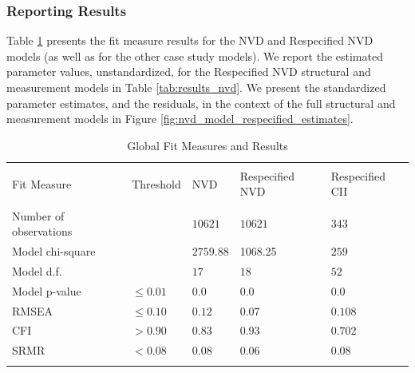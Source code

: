 \subsubsection{Reporting Results}
\label{sec:case_nvd_results}

Table \ref{tab:results_fit_all} presents the fit measure results for the NVD  and Respecified NVD models (as well as for the other case study models). We report the estimated parameter values, unstandardized, for the Respecified NVD structural and measurement models in Table \ref{tab:results_nvd}. We present the standardized parameter estimates, and the residuals, in the context of the full structural and measurement models in Figure \ref{fig:nvd_model_respecified_estimates}.

\begin{table}
	\begin{center}	
		\caption{Global Fit Measures and Results}
			\label{tab:results_fit_all}
			\begin{tabular}{p{3cm}p{1cm}|p{2cm}p{2cm}p{2cm}}
				\\[-1.8ex]\hline 
				\hline \\[-1.8ex] 
				Fit Measure & Threshold & NVD	& Respecified NVD & Respecified CII  \\
				\hline \\[-1.8ex] 				
				Number of observations &  & $10621$  & $10621$ & $343$  \\				
				Model chi-square &  & $2759.88$ & 1068.25 & $259$  \\				
				Model d.f. &  & $17$ & $18$ & $52$  \\		
				Model p-value & $\leq 0.01$ & $0.0$ & $0.0$ & $0.0$  \\
				RMSEA & $\leq 0.10$ &  $0.12$ &  $0.07$ & $0.108$   \\
				CFI & $> 0.90$ & $0.83$ & $0.93$  & $0.702$  \\
				SRMR & $< 0.08$ & $0.08$ & $0.06$ & $0.08$  \\
				\hline \\[-1.8ex] 				
			\end{tabular}
	\end{center}
\end{table}

